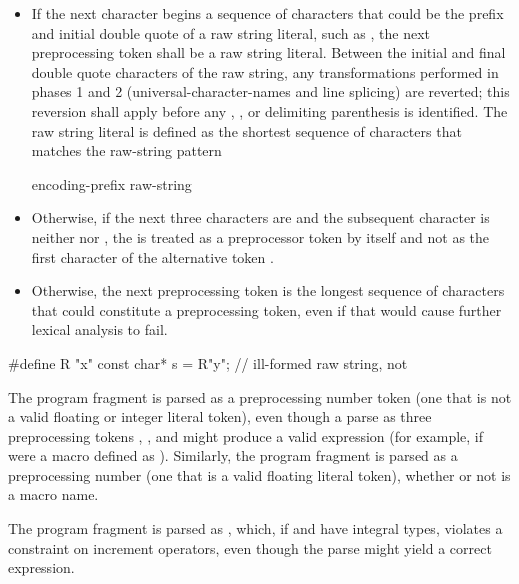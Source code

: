 \begin{itemize}
\item If the next character begins a sequence of characters that could be the prefix
and initial double quote of a raw string literal, such as , the next preprocessing
token shall be a raw string literal. Between the initial and final
double quote characters of the raw string, any transformations performed in phases
1 and 2 (universal-character-names and line splicing) are reverted; this reversion
shall apply before any , , or delimiting
parenthesis is identified. The raw string literal is defined as the shortest sequence
of characters that matches the raw-string pattern

\begin{ncbnf}
encoding-prefix\opt {} raw-string
\end{ncbnf}

\item Otherwise, if the next three characters are \tcode{<::} and the subsequent character
is neither \tcode{:} nor \tcode{>}, the \tcode{<} is treated as a preprocessor token by
itself and not as the first character of the alternative token \tcode{<:}.

\item Otherwise,
the next preprocessing token is the longest sequence of
characters that could constitute a preprocessing token, even if that
would cause further lexical analysis to fail.
\end{itemize}

\enterexample
\begin{codeblock}
#define R "x"
const char* s = R"y";           // ill-formed raw string, not 
\end{codeblock}
\exitexample

\pnum
\enterexample The program fragment  is parsed as a
preprocessing number token (one that is not a valid floating or integer
literal token), even though a parse as three preprocessing tokens
, \tcode{+}, and  might produce a valid expression (for example,
if  were a macro defined as ). Similarly, the
program fragment  is parsed as a preprocessing number (one
that is a valid floating literal token), whether or not  is a
macro name. \exitexample

\pnum
\enterexample The program fragment  is parsed as , which, if  and  have integral types,
violates a constraint on increment operators, even though the parse
 might yield a correct expression. \exitexample%

